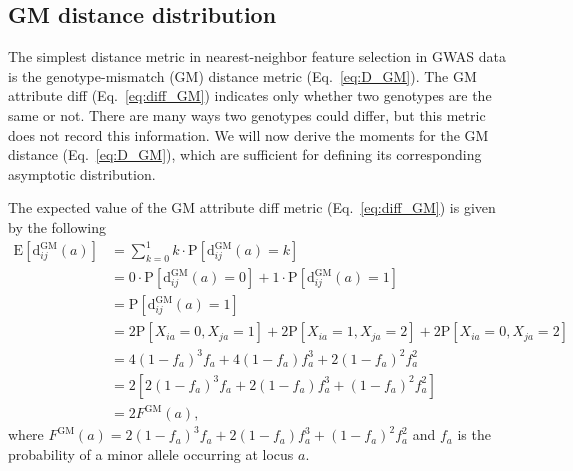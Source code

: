 \documentclass[10pt,letterpaper]{article}
\begin{document}
\subsection{GM distance distribution}

The simplest distance metric in nearest-neighbor feature selection in GWAS data is the genotype-mismatch (GM) distance metric (Eq.~\ref{eq:D_GM}). The GM attribute diff (Eq.~\ref{eq:diff_GM}) indicates only whether two genotypes are the same or not. There are many ways two genotypes could differ, but this metric does not record this information. We will now derive the moments for the GM distance (Eq.~\ref{eq:D_GM}), which are sufficient for defining its corresponding asymptotic distribution.

The expected value of the GM attribute diff metric (Eq.~\ref{eq:diff_GM}) is given by the following
%
\begin{equation}\label{eq:mean_diff_GM}
\begin{aligned}
\text{E}\left[\text{d}^\text{GM}_{ij}(a)\right] &= \sum_{k=0}^{1} k \cdot \text{P}\left[\text{d}^\text{GM}_{ij}(a) = k\right] \\
&= 0 \cdot \text{P}\left[\text{d}^\text{GM}_{ij}(a) = 0\right] + 1 \cdot \text{P}\left[\text{d}^\text{GM}_{ij}(a) = 1\right] \\
&= \text{P}\left[\text{d}^\text{GM}_{ij}(a) = 1\right] \\
&= 2\text{P}[X_{ia} = 0, X_{ja} = 1] + 2\text{P}[X_{ia} = 1, X_{ja} = 2] + 2\text{P}[X_{ia} = 0, X_{ja} = 2] \\
&= 4(1 - f_a)^3f_a + 4(1 - f_a)f^3_a + 2(1 - f_a)^2f^2_a \\
&= 2\left[2(1 - f_a)^3f_a + 2(1 - f_a)f^3_a + (1 - f_a)^2f^2_a\right] \\
&= 2F^\text{GM}(a),
\end{aligned}
\end{equation}
%
where $F^\text{GM}(a) = 2(1 - f_a)^3f_a + 2(1 - f_a)f^3_a + (1 - f_a)^2f^2_a$ and $f_a$ is the probability of a minor allele occurring at locus $a$.
\end{document}
